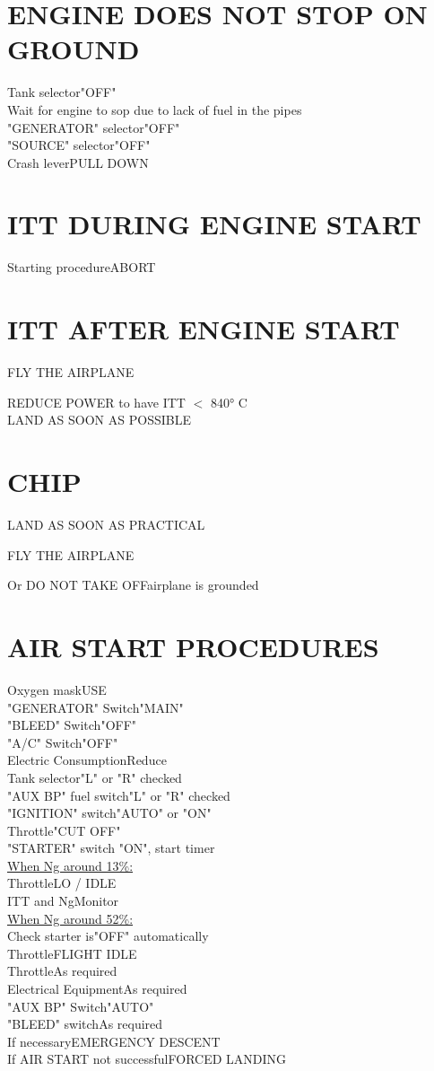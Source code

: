 \documentclass{article}
\newcommand{\fly}{\vspace{-1em}\begin{center}\color{Green}FLY THE AIRPLANE\end{center}\vspace{-1em}}
\begin{document}
\begin{multicols*}{2}
\section*{ENGINE DOES NOT STOP ON GROUND}
Tank selector\dotfill "OFF"\\
Wait for engine to sop due to lack of fuel in the pipes\\
"GENERATOR" selector\dotfill "OFF"\\
"SOURCE" selector\dotfill "OFF"\\
Crash lever\dotfill PULL DOWN
\section*{\color{Red}ITT \color{White}DURING ENGINE START}
Starting procedure\dotfill ABORT
\section*{\color{Red}ITT \color{White}AFTER ENGINE START}
\vspace{1em}
\fly
REDUCE POWER to have ITT $<$ 840° C\\
LAND AS SOON AS POSSIBLE
\section*{\color{Orange}CHIP}
LAND AS SOON AS PRACTICAL
\fly
Or DO NOT TAKE OFF\dotfill airplane is grounded
\vfill\null
\section*{AIR START PROCEDURES}
Oxygen mask\dotfill USE\\
"GENERATOR" Switch\dotfill "MAIN"\\
"BLEED" Switch\dotfill "OFF"\\
"A/C" Switch\dotfill "OFF"\\
Electric Consumption\dotfill Reduce\\
Tank selector\dotfill "L" or "R" checked\\
"AUX BP" fuel switch\dotfill "L" or "R" checked\\
"IGNITION" switch\dotfill "AUTO" or "ON"\\
Throttle\dotfill  "CUT OFF"\\
"STARTER" switch "ON", start timer\\
\underline{When Ng around 13\%:}\\
Throttle\dotfill LO / IDLE\\
ITT and Ng\dotfill Monitor\\
\underline{When Ng around 52\%:}\\
Check starter is\dotfill "OFF" automatically\\
Throttle\dotfill FLIGHT IDLE\\
Throttle\dotfill As required\\
Electrical Equipment\dotfill As required\\
"AUX BP" Switch\dotfill "AUTO"\\
"BLEED" switch\dotfill As required\\
If necessary\dotfill EMERGENCY DESCENT\\
If AIR START not successful\dotfill FORCED LANDING

\end{multicols*}
\end{document}
